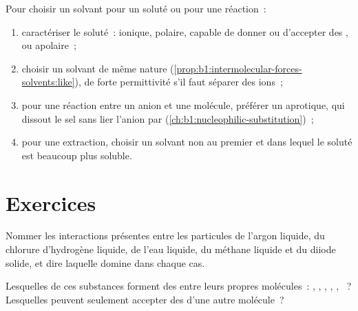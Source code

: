 \begin{method}\label{met:b1:intermolecular-forces-solvents:choose}
Pour choisir un solvant pour un soluté ou pour une réaction~:
\begin{enumerate}
  \item caractériser le soluté~: ionique, polaire, capable de donner ou
        d'accepter des , ou apolaire~;
  \item choisir un solvant de même nature (\cref{prop:b1:intermolecular-forces-solvents:like}),
        de forte permittivité s'il faut séparer des ions~;
  \item pour une réaction entre un anion et une molécule, préférer un
         aprotique, qui dissout le sel sans lier l'anion
        par  (\cref{ch:b1:nucleophilic-substitution})~;
  \item pour une extraction, choisir un solvant non  au premier
        et dans lequel le soluté est beaucoup plus soluble.
\end{enumerate}
\end{method}

\section{Exercices}

\begin{exercise}[$\star$]\label{exo:b1:intermolecular-forces-solvents:1}
Nommer les interactions présentes entre les particules de l'argon
liquide, du chlorure d'hydrogène liquide, de l'eau liquide, du méthane
liquide et du diiode solide, et dire laquelle domine dans chaque cas.
\end{exercise}

\begin{exercise}[$\star$]\label{exo:b1:intermolecular-forces-solvents:2}
Lesquelles de ces substances forment des  entre leurs
propres molécules~: , , , ,
, ~? Lesquelles peuvent seulement accepter des  d'une autre molécule~?
\end{exercise}

